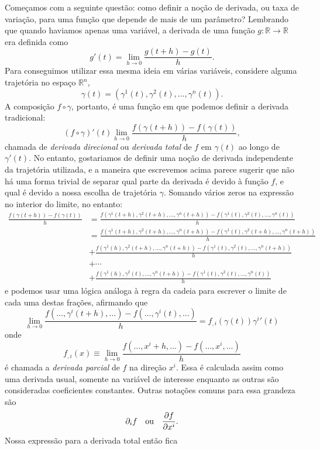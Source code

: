 \documentclass[a4paper, 12pt]{article}
\newcommand{\pd}[3]{\ifblank{#3}{}{\left(}\frac{\partial #1}{\partial #2}\ifblank{#3}{}{\right)_{#3}}}
\theoremstyle{definition}
\theoremstyle{definition}
\begin{document}
Começamos com a seguinte questão: como definir a noção de derivada, ou taxa de variação, para uma função que
depende de mais de um parâmetro? Lembrando que quando haviamos apenas uma variável, a derivada de uma função
$g:\mathbb R\rightarrow\mathbb R$ era definida como
$$g'(t)=\lim\limits_{h\rightarrow0}\frac{g(t+h)-g(t)}{h}.$$
Para conseguimos utilizar essa mesma ideia em várias variáveis, considere alguma trajetória no espaço 
$\mathbb R^n$,
$$\gamma(t)=(\gamma^1(t),\gamma^2(t),\dots,\gamma^n(t)).$$
A composição $f\circ\gamma$, portanto, é uma função em que podemos definir a derivada tradicional:
$$(f\circ\gamma)'(t)\lim\limits_{h\rightarrow0}\frac{f(\gamma(t+h))-f(\gamma(t))}{h},$$
chamada de \textit{derivada direcional} ou \textit{derivada total} de $f$ em $\gamma(t)$ ao longo de $\gamma'(t)$. 
No entanto, gostariamos de definir uma noção de derivada independente da trajetória utilizada, e a maneira 
que escrevemos acima parece sugerir que não há uma forma trivial de separar qual parte da derivada é devido à função $f$,
e qual é devido a nossa escolha de trajetória $\gamma$. Somando vários zeros na expressão no interior do limite, 
no entanto:
\begin{align*}
    \frac{f(\gamma(t+h))-f(\gamma(t))}{h}
    &=\frac{f(\gamma^1(t+h),\gamma^2(t+h),\dots,\gamma^n(t+h))-f(\gamma^1(t),\gamma^2(t),\dots,\gamma^n(t))}{h}\\
    &=\frac{f(\gamma^1(t+h),\gamma^2(t+h),\dots,\gamma^n(t+h))-f(\gamma^1(t),\gamma^2(t+h),\dots,\gamma^n(t+h))}{h}\\
    &+\frac{f(\gamma^1(h),\gamma^2(t+h),\dots,\gamma^n(t+h))-f(\gamma^1(t),\gamma^2(t),\dots,\gamma^n(t+h))}{h}\\
    &+\cdots\\
    &+\frac{f(\gamma^1(h),\gamma^2(t),\dots,\gamma^n(t+h))-f(\gamma^1(t),\gamma^2(t),\dots,\gamma^n(t))}{h}
\end{align*}
e podemos usar uma lógica análoga à regra da cadeia para escrever o limite de cada uma destas frações,
afirmando que
$$\lim\limits_{h\rightarrow0}\frac{f(\dots,\gamma^i(t+h),\dots)
-f(\dots,\gamma^i(t),\dots)}{h}=f_{,i}(\gamma(t))\gamma^i{'}(t)$$
onde
$$f_{,i}(x)\equiv\lim\limits_{h\rightarrow0}\frac{f(\dots,x^i+h,\dots)-f(\dots,x^i,\dots)}{h}$$
é chamada a \textit{derivada parcial} de $f$ na direção $x^i$. Essa é calculada assim como uma derivada
usual, somente na variável de interesse enquanto as outras são consideradas coeficientes constantes.
Outras notações comuns para essa grandeza são
$$\partial_i f\quad\text{ou}\quad\pd{f}{x^i}{}.$$
Nossa expressão para a derivada total então fica
\end{document}
